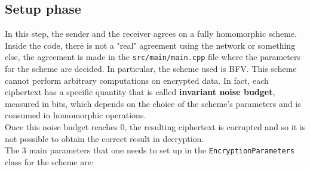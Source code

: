 \documentclass[10pt]{extarticle}
\begin{document}
\subsection{Setup phase}
In this step, the sender and the receiver agrees on a fully homomorphic scheme.\\
Inside the code, there is not a "real" agreement using the network or something else, the agreement is made in the \texttt{src/main/main.cpp} file where the parameters for the scheme are decided. In particular, the scheme used is BFV. This scheme cannot perform arbitrary computations on encrypted data. In fact, each ciphertext has a specific quantity that is called \textbf{invariant noise budget}, measured in bits, which depends on the choice of the scheme's parameters and is consumed in homomorphic operations.\\Once this noise budget reaches 0, the resulting ciphertext is corrupted and so it is not possible to obtain the correct result in decryption.\\The 3 main parameters that one needs to set up in the \texttt{EncryptionParameters} class for the scheme are:
\end{document}
